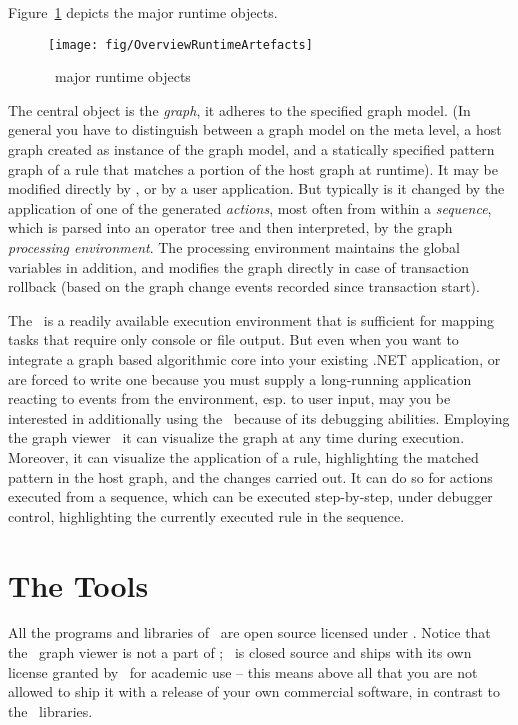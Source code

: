 Figure~\ref{process} depicts the major runtime objects.

\begin{figure}[htbp]
  \centering
  \texttt{[image: fig/OverviewRuntimeArtefacts]}
  \caption{\GrG\ major runtime objects}
  \label{process}
\end{figure}

The central object is the \emph{graph}, it adheres to the specified graph model.
(In general you have to distinguish between a graph model on the meta level, a host graph created as instance of the graph model, and a statically specified pattern graph of a rule that matches a portion of the host graph at runtime).
It may be modified directly by \GrShell, or by a user application.
But typically is it changed by the application of one of the generated \emph{actions}, most often from within a \emph{sequence}, which is parsed into an operator tree and then interpreted, by the graph \emph{processing environment}.
The processing environment maintains the global variables in addition, and modifies the graph directly in case of transaction rollback (based on the graph change events recorded since transaction start).

The \GrShell\ is a readily available execution environment that is sufficient for mapping tasks that require only console or file output.
But even when you want to integrate a graph based algorithmic core into your existing .NET application, 
or are forced to write one because you must supply a long-running application reacting to events from the environment, esp. to user input,
may you be interested in additionally using the \GrShell\ because of its debugging abilities.
Employing the graph viewer \yComp\ it can visualize the graph at any time during execution.
Moreover, it can visualize the application of a rule, highlighting the matched pattern in the host graph, and the changes carried out.
It can do so for actions executed from a sequence, which can be executed step-by-step, under debugger control, highlighting the currently executed rule in the sequence.

\section{The Tools}

All the programs and libraries of \GrG\ are open source licensed under .
Notice that the \yComp\ graph viewer is not a part of \GrG ; \yComp\ is closed source and ships with its own license granted by \yFiles\ for academic use --
this means above all that you are not allowed to ship it with a release of your own commercial software, in contrast to the \GrG\ libraries.

